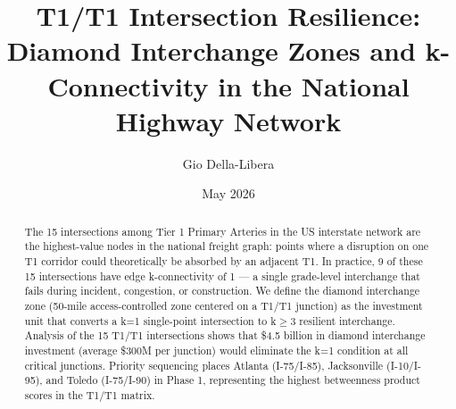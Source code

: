 \documentclass[12pt]{article}
\title{T1/T1 Intersection Resilience: Diamond Interchange Zones and k-Connectivity in the National Highway Network}
\author{Gio Della-Libera}
\date{May 2026}
\begin{document}
\maketitle
\begin{abstract}
The 15 intersections among Tier 1 Primary Arteries in the US interstate network are the highest-value nodes in the national freight graph: points where a disruption on one T1 corridor could theoretically be absorbed by an adjacent T1. In practice, 9 of these 15 intersections have edge k-connectivity of 1 --- a single grade-level interchange that fails during incident, congestion, or construction. We define the diamond interchange zone (50-mile access-controlled zone centered on a T1/T1 junction) as the investment unit that converts a k=1 single-point intersection to k$\geq$3 resilient interchange. Analysis of the 15 T1/T1 intersections shows that \$4.5 billion in diamond interchange investment (average \$300M per junction) would eliminate the k=1 condition at all critical junctions. Priority sequencing places Atlanta (I-75/I-85), Jacksonville (I-10/I-95), and Toledo (I-75/I-90) in Phase 1, representing the highest betweenness product scores in the T1/T1 matrix.
\end{abstract}








\end{document}
